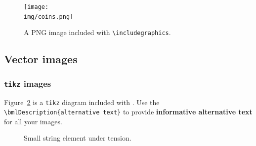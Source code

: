 \begin{figure}[H]
    \centering
    \texttt{[image: \\img/coins.png]}
    \caption{A PNG image included with \texttt{\textbackslash includegraphics}.}
    \label{fig:coins}
\end{figure}


\subsection{Vector images}
\subsubsection{\texttt{tikz} images}
\label{demo:fig:tikz}

Figure~\ref{fig:string} is a \verb|tikz| diagram included with \verb||.
Use the \verb|\bmlDescription{alternative text}| to provide \textbf{informative alternative text} for all your images.

\begin{figure}[H]
    \centering
    \caption{Small string element under tension.}
    \label{fig:string}
\end{figure}




